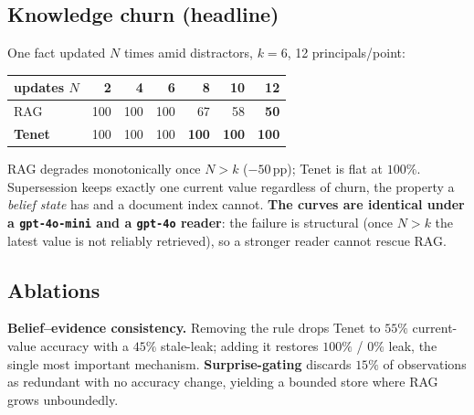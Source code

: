 \documentclass[11pt]{article}
\begin{document}
\subsection{Knowledge churn (headline)}
\label{sec:churn}
One fact updated $N$ times amid distractors, $k=6$, 12 principals/point:
\begin{center}\small
\begin{tabular}{lrrrrrr}
\toprule
updates $N$ & 2 & 4 & 6 & 8 & 10 & 12 \\
\midrule
RAG & 100 & 100 & 100 & 67 & 58 & \textbf{50} \\
\textbf{Tenet} & 100 & 100 & 100 & \textbf{100} & \textbf{100} & \textbf{100} \\
\bottomrule
\end{tabular}
\end{center}
RAG degrades monotonically once $N>k$ ($-50$\,pp); Tenet is flat at $100\%$. Supersession
keeps exactly one current value regardless of churn, the property a \emph{belief state} has
and a document index cannot. \textbf{The curves are identical under a \texttt{gpt-4o-mini} and a \texttt{gpt-4o} reader}: the failure is structural (once $N>k$ the latest value is not reliably retrieved), so a stronger reader cannot rescue RAG.

\subsection{Ablations}
\label{sec:abl}
\textbf{Belief--evidence consistency.} Removing the rule drops Tenet to $55\%$ current-value
accuracy with a $45\%$ stale-leak; adding it restores $100\%$ / $0\%$ leak, the single most
important mechanism. \textbf{Surprise-gating} discards $15\%$ of observations as redundant
with no accuracy change, yielding a bounded store where RAG grows unboundedly.
\end{document}
